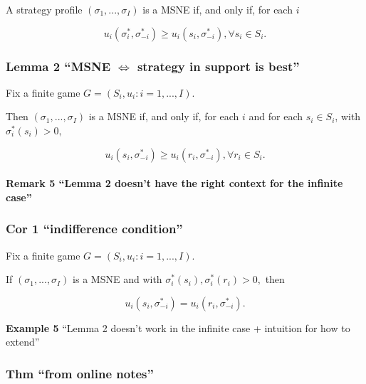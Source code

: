 \documentclass[
]{article}
\begin{document}
A strategy profile \((\sigma_1, ..., \sigma_I)\) is a MSNE if, and only
if, for each \(i\)

\[u_i(\sigma_i^*, \sigma_{-i}^*) \geq u_i(s_i, \sigma_{-i}^*), \forall s_i \in S_i.\]

\hypertarget{lemma-2-msne-iff-strategy-in-support-is-best}{%
\subsubsection{\texorpdfstring{Lemma 2 ``MSNE \(\iff\) strategy in
support is
best''}{Lemma 2 ``MSNE \textbackslash iff strategy in support is best''}}\label{lemma-2-msne-iff-strategy-in-support-is-best}}

Fix a finite game \(G = (S_i, u_i: i = 1, ..., I)\).

Then \((\sigma_1, ..., \sigma_I)\) is a MSNE if, and only if, for each
\(i\) and for each \(s_i \in S_i\), with \(\sigma_i^*(s_i) > 0,\)

\[u_i(s_i, \sigma_{-i}^*) \geq u_i(r_i, \sigma_{-i}^*), \forall r_i \in S_i.\]

\hypertarget{remark-5-lemma-2-doesnt-have-the-right-context-for-the-infinite-case}{%
\paragraph{Remark 5 ``Lemma 2 doesn't have the right context for the
infinite
case''}\label{remark-5-lemma-2-doesnt-have-the-right-context-for-the-infinite-case}}

\hypertarget{cor-1-indifference-condition}{%
\subsubsection{Cor 1 ``indifference
condition''}\label{cor-1-indifference-condition}}

Fix a finite game \(G = (S_i, u_i: i = 1, ..., I)\).

If \((\sigma_1, ..., \sigma_I)\) is a MSNE and with
\(\sigma_i^*(s_i), \sigma_i^*(r_i) > 0,\) then

\[u_i(s_i, \sigma_{-i}^*) = u_i(r_i, \sigma_{-i}^*).\]

\textbf{Example 5} ``Lemma 2 doesn't work in the infinite case +
intuition for how to extend''

\hypertarget{thm-from-online-notes}{%
\subsubsection{Thm ``from online notes''}\label{thm-from-online-notes}}
\end{document}
